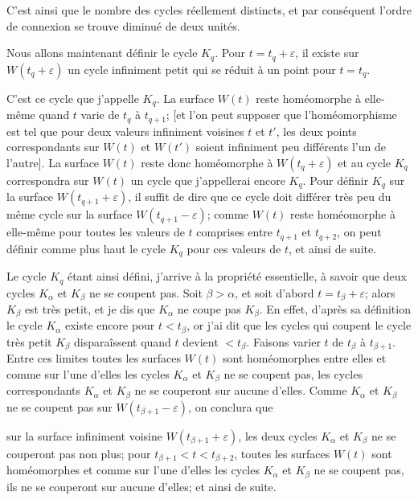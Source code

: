 \documentclass{article}
\begin{document}
C'est ainsi que le nombre des cycles réellement distincts, et par conséquent l'ordre de connexion se trouve diminué de deux unités.

Nous allons maintenant définir le cycle $K_{q}$. Pour $t = t_{q} + \varepsilon$, il existe sur $W(t_{q} + \varepsilon)$ un cycle infiniment petit qui se réduit à un point pour $t = t_{q}$.

C'est ce cycle que j'appelle $K_{q}$. La surface $W(t)$ reste homéomorphe à elle-même quand $t$ varie de $t_{q}$ à $t_{q+1}$; [et l'on peut supposer que l'homéomorphisme est tel que pour deux valeurs infiniment voisines $t$ et $t'$, les deux points correspondants sur $W(t)$ et $W(t')$ soient infiniment peu différents l'un de l'autre]. La surface $W(t)$ reste donc homéomorphe à $W(t_{q} + \varepsilon)$ et au cycle $K_{q}$ correspondra sur $W(t)$ un cycle que j'appellerai encore $K_{q}$. Pour définir $K_{q}$ sur la surface $W(t_{q+1} + \varepsilon)$, il suffit de dire que ce cycle doit différer très peu du même cycle sur la surface $W(t_{q+1} - \varepsilon)$; comme $W(t)$ reste homéomorphe à elle-même pour toutes les valeurs de $t$ comprises entre $t_{q+1}$ et $t_{q+2}$, on peut définir comme plus haut le cycle $K_{q}$ pour ces valeurs de $t$, et ainsi de suite.

Le cycle $K_{q}$ étant ainsi défini, j'arrive à la propriété essentielle, à savoir que deux cycles $K_{\alpha}$ et $K_{\beta}$ ne se coupent pas. Soit $\beta > \alpha$, et soit d'abord $t = t_{\beta} + \varepsilon$; alors $K_{\beta}$ est très petit, et je dis que $K_{\alpha}$ ne coupe pas $K_{\beta}$. En effet, d'après sa définition le cycle $K_{\alpha}$ existe encore pour $t < t_{\beta}$, or j'ai dit que les cycles qui coupent le cycle très petit $K_{\beta}$ disparaîssent quand $t$ devient $< t_{\beta}$. Faisons varier $t$ de $t_{\beta}$ à $t_{\beta+1}$. Entre ces limites toutes les surfaces $W(t)$ sont homéomorphes entre elles et comme sur l'une d'elles les cycles $K_{\alpha}$ et $K_{\beta}$ ne se coupent pas, les cycles correspondants $K_{\alpha}$ et $K_{\beta}$ ne se couperont sur aucune d'elles. Comme $K_{\alpha}$ et $K_{\beta}$ ne se coupent pas sur $W(t_{\beta+1} - \varepsilon)$, on conclura que

sur la surface infiniment voisine $W(t_{\beta+1} + \varepsilon)$, les deux cycles $K_{\alpha}$ et $K_{\beta}$ ne se couperont pas non plus; pour $t_{\beta+1} < t < t_{\beta+2}$, toutes les surfaces $W(t)$ sont homéomorphes et comme sur l'une d'elles les cycles $K_{\alpha}$ et $K_{\beta}$ ne se coupent pas, ils ne se couperont sur aucune d'elles; et ainsi de suite.
\end{document}
